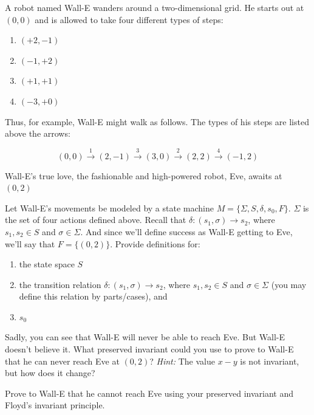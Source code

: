 \documentclass[solution,letterpaper]{cs20}
\begin{document}
    \begin{problem}
        A robot named Wall-E wanders around a two-dimensional grid. He starts out at $(0,0)$ and is allowed to take four different types of steps:
        \begin{enumerate}
            \item $(+2, -1)$
            \item $(-1, +2)$
            \item $(+1, +1)$
            \item $(-3, +0)$
        \end{enumerate}

        Thus, for example, Wall-E might walk as follows. The types of his steps are listed above the arrows:

        \[(0,0)\xrightarrow{1}(2,-1)\xrightarrow{3}(3,0)\xrightarrow{2}(2,2)\xrightarrow{4}(-1,2)\]

        Wall-E’s true love, the fashionable and high-powered robot, Eve, awaits at $(0,2)$

        \subproblem Let Wall-E's movements be modeled by a state machine $M = \{\Sigma, S,\delta, s_0, F\}$. $\Sigma$ is the set of four actions defined above. Recall that $\delta : (s_1, \sigma) \to s_2$, where $s_1,s_2 \in S$ and $\sigma \in \Sigma$. And since we'll define success as Wall-E getting to Eve, we'll say that $F = \{(0,2)\}$. Provide definitions for:
        \begin{enumerate}
            \item the state space $S$
            \item the transition relation $\delta : (s_1, \sigma) \to s_2$, where $s_1,s_2 \in S$ and $\sigma \in \Sigma$ (you may define this relation by parts/cases), and
            \item $s_0$
        \end{enumerate}

        \subproblem Sadly, you can see that Wall-E will never be able to reach Eve. But Wall-E doesn't believe it. What preserved invariant could you use to prove to Wall-E that he can never reach Eve at $(0,2)$? \emph{Hint:} The value $x-y$ is not invariant, but how does it change?

        \subproblem Prove to Wall-E that he cannot reach Eve using your preserved invariant and Floyd's invariant principle.


\end{problem}
\end{document}
